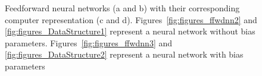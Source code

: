 \documentclass[11pt]{article}
\begin{document}
\begin{figure}[]
	\centering
		\hspace{2mm}

		\hspace{8mm} 
		\caption{Feedforward neural networks (a and b) with their corresponding computer representation (c and d). Figures~\ref{fig:figures_ffwdnn2} and \ref{fig:figures_DataStructure1} represent a neural network without bias parameters. Figures~\ref{fig:figures_ffwdnn3} and \ref{fig:figures_DataStructure2} represent a neural network with bias parameters}
	\label{fig:figures_ffwdnn_DS}	
\end{figure}
\end{document}
